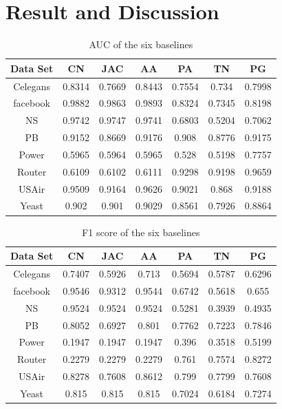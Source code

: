 \documentclass[12pt]{article}
\begin{document}
	
	\section{Result and Discussion}
	\begin{table}
		\begin{center}
			\begin{tabular}{|c|c|c|c|c|c|c|}
				\hline
				Data Set & CN & JAC & AA & PA  & TN & PG \\
				\hline
				Celegans&0.8314&0.7669&0.8443&0.7554&0.734&0.7998\\
				facebook&0.9882&0.9863&0.9893&0.8324&0.7345&0.8198\\
				NS&0.9742&0.9747&0.9741&0.6803&0.5204&0.7062\\
				PB&0.9152&0.8669&0.9176&0.908&0.8776&0.9175\\
				Power&0.5965&0.5964&0.5965&0.528&0.5198&0.7757\\
				Router&0.6109&0.6102&0.6111&0.9298&0.9198&0.9659\\
				USAir&0.9509&0.9164&0.9626&0.9021&0.868&0.9188\\
				Yeast&0.902&0.901&0.9029&0.8561&0.7926&0.8864\\
				\hline
			\end{tabular}
		\end{center}
		\caption{AUC of the six baselines}
		\label{tab:auc}
	\end{table}
	
	\begin{table}
		\begin{center}
			\begin{tabular}{|c|c|c|c|c|c|c|}
				\hline
				Data Set & CN & JAC & AA & PA & TN & PG \\
				\hline
				Celegans&0.7407&0.5926&0.713&0.5694&0.5787&0.6296\\
				facebook&0.9546&0.9312&0.9544&0.6742&0.5618&0.655\\
				NS&0.9524&0.9524&0.9524&0.5281&0.3939&0.4935\\
				PB&0.8052&0.6927&0.801&0.7762&0.7223&0.7846\\
				Power&0.1947&0.1947&0.1947&0.396&0.3518&0.5199\\
				Router&0.2279&0.2279&0.2279&0.761&0.7574&0.8272\\
				USAir&0.8278&0.7608&0.8612&0.799&0.7799&0.7608\\
				Yeast&0.815&0.815&0.815&0.7024&0.6184&0.7274\\
				\hline
			\end{tabular}
		\end{center}
		\caption{F1 score of the six baselines}
		\label{tab:f1}
	\end{table}
	
\end{document}
